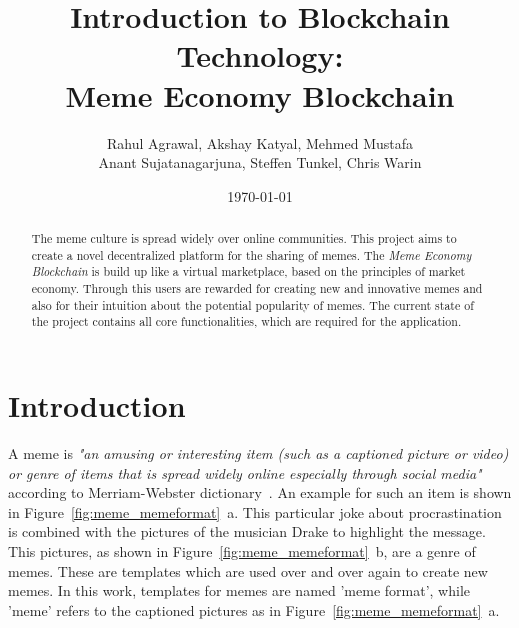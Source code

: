 \documentclass[12pt]{article}
\title{Introduction to Blockchain Technology:\\
    Meme Economy Blockchain}
\date{\today}
\author{Rahul Agrawal, Akshay Katyal, Mehmed Mustafa\\
Anant Sujatanagarjuna, Steffen Tunkel, Chris Warin}
\begin{document}
\maketitle
\thispagestyle{empty}
\begin{abstract}%
The meme culture is spread widely over online communities. This project aims to create a novel decentralized platform for the sharing of memes. The \textit{Meme Economy Blockchain} is build up like a virtual marketplace, based on the principles of market economy. Through this users are rewarded for creating new and innovative memes and also for their intuition about the potential popularity of memes. The current state of the project contains all core functionalities, which are required for the application.


\end{abstract}

\newpage
\tableofcontents
\newpage




\section{Introduction} \label{sec:Intro}%

    A meme is \textit{"an amusing or interesting item (such as a captioned picture or video) or genre of items that is spread widely online especially through social media"} according to Merriam-Webster dictionary~\cite{meme_def}.
    An example for such an item is shown in Figure~\ref{fig:meme_memeformat}~a. This particular joke about procrastination is combined with the pictures of the musician Drake to highlight the message. This pictures, as shown in Figure~\ref{fig:meme_memeformat}~b, are a genre of memes. These are templates which are used over and over again to create new memes. In this work, templates for memes are named 'meme format', while 'meme' refers to the captioned pictures as in Figure~\ref{fig:meme_memeformat}~a.
\end{document}
